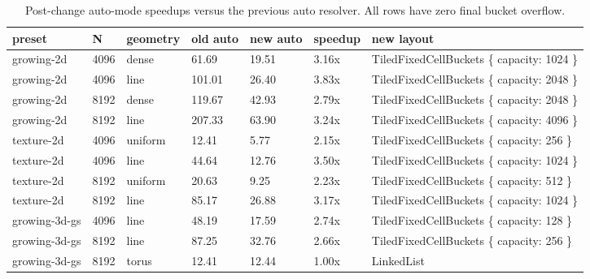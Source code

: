 \documentclass[10pt,twocolumn]{article}
\begin{document}
\begin{table}[t]
\centering
\small
\begin{tabular}{lllllll}
\toprule
preset & N & geometry & old auto & new auto & speedup & new layout \\
\midrule
growing-2d & 4096 & dense & 61.69 & 19.51 & 3.16x & TiledFixedCellBuckets \{ capacity: 1024 \} \\
growing-2d & 4096 & line & 101.01 & 26.40 & 3.83x & TiledFixedCellBuckets \{ capacity: 2048 \} \\
growing-2d & 8192 & dense & 119.67 & 42.93 & 2.79x & TiledFixedCellBuckets \{ capacity: 2048 \} \\
growing-2d & 8192 & line & 207.33 & 63.90 & 3.24x & TiledFixedCellBuckets \{ capacity: 4096 \} \\
texture-2d & 4096 & uniform & 12.41 & 5.77 & 2.15x & TiledFixedCellBuckets \{ capacity: 256 \} \\
texture-2d & 4096 & line & 44.64 & 12.76 & 3.50x & TiledFixedCellBuckets \{ capacity: 1024 \} \\
texture-2d & 8192 & uniform & 20.63 & 9.25 & 2.23x & TiledFixedCellBuckets \{ capacity: 512 \} \\
texture-2d & 8192 & line & 85.17 & 26.88 & 3.17x & TiledFixedCellBuckets \{ capacity: 1024 \} \\
growing-3d-gs & 4096 & line & 48.19 & 17.59 & 2.74x & TiledFixedCellBuckets \{ capacity: 128 \} \\
growing-3d-gs & 8192 & line & 87.25 & 32.76 & 2.66x & TiledFixedCellBuckets \{ capacity: 256 \} \\
growing-3d-gs & 8192 & torus & 12.41 & 12.44 & 1.00x & LinkedList \\
\bottomrule
\end{tabular}
\caption{Post-change auto-mode speedups versus the previous auto resolver. All rows have zero final bucket overflow.}
\label{tab:auto}
\end{table}
\end{document}
